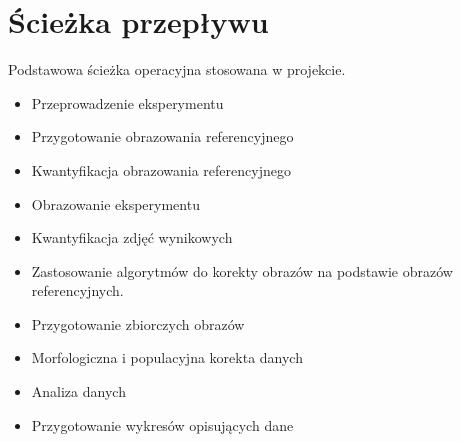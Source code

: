\section{Ścieżka przepływu}

Podstawowa ścieżka operacyjna stosowana w projekcie.

\begin{itemize}
\item Przeprowadzenie eksperymentu
\item Przygotowanie obrazowania referencyjnego
\item Kwantyfikacja obrazowania referencyjnego 
\item Obrazowanie  eksperymentu
\item Kwantyfikacja zdjęć wynikowych
\item Zastosowanie algorytmów do korekty obrazów na podstawie obrazów referencyjnych.
\item Przygotowanie zbiorczych obrazów
\item Morfologiczna i populacyjna korekta danych
\item Analiza danych
\item Przygotowanie wykresów opisujących dane
\end{itemize}


